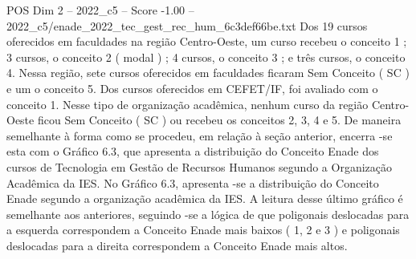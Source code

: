 \begin{textsample}{POS Dim 2 – 2022\_c5 – Score -1.00 – 2022\_c5/enade\_2022\_tec\_gest\_rec\_hum\_6c3def66be.txt}
Dos 19 cursos oferecidos em faculdades na região Centro-Oeste, um curso recebeu o conceito 1 ; 3 cursos, o conceito 2 ( modal ) ; 4 cursos, o conceito 3 ; e três cursos, o conceito 4.
Nessa região, sete cursos oferecidos em faculdades ficaram Sem Conceito ( SC ) e um o conceito 5.
Dos cursos oferecidos em CEFET/IF, foi avaliado com o conceito 1.
Nesse tipo de organização acadêmica, nenhum curso da região Centro-Oeste ficou Sem Conceito ( SC ) ou recebeu os conceitos 2, 3, 4 e 5.
De maneira semelhante à forma como se procedeu, em relação à seção anterior, encerra -se esta com o Gráfico 6.3, que apresenta a distribuição do Conceito Enade dos cursos de Tecnologia em Gestão de Recursos Humanos segundo a Organização Acadêmica da IES.
No Gráfico 6.3, apresenta -se a distribuição do Conceito Enade segundo a organização acadêmica da IES.
A leitura desse último gráfico é semelhante aos anteriores, seguindo -se a lógica de que poligonais deslocadas para a esquerda correspondem a Conceito Enade mais baixos ( 1, 2 e 3 ) e poligonais deslocadas para a direita correspondem a Conceito Enade mais altos.

\end{textsample}
